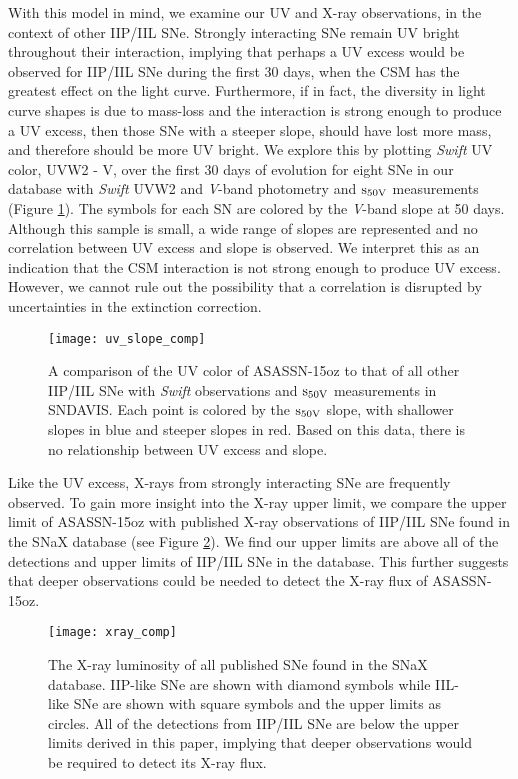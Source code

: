 \documentclass[a4paper,fleqn,usenatbib]{mnras}
\begin{document}
With this model in mind, we examine our UV and X-ray observations, in the context of other IIP/IIL SNe.
Strongly interacting SNe remain UV bright throughout their interaction, implying that perhaps a UV excess would be observed for IIP/IIL SNe during the first 30 days, when the CSM has the greatest effect on the light curve.
Furthermore, if in fact, the diversity in light curve shapes is due to mass-loss and the interaction is strong enough to produce a UV excess, then those SNe with a steeper slope, should have lost more mass, and therefore should be more UV bright.
We explore this by plotting {\it Swift} UV color, UVW2 - V, over the first 30 days of evolution for eight SNe in our database with {\it Swift} UVW2 and {\it V}-band photometry and $\rm{s_{50V}}$ measurements (Figure \ref{fig:UVColor}). 
The symbols for each SN are colored by the {\it V}-band slope at 50 days. 
Although this sample is small, a wide range of slopes are represented and no correlation between UV excess and slope is observed.
We interpret this as an indication that the CSM interaction is not strong enough to produce UV excess.
However, we cannot rule out the possibility that a correlation is disrupted by uncertainties in the extinction correction.
\begin{figure}
\begin{center}
\texttt{[image: uv\_slope\_comp]} %
\caption{A comparison of the UV color of ASASSN-15oz to that of all other IIP/IIL SNe with \textit{Swift} observations and $\rm{s_{50V}}$ measurements in SNDAVIS.
Each point is colored by the $\rm{s_{50V}}$ slope, with shallower slopes in blue and steeper slopes in red. 
Based on this data, there is no relationship between UV excess and slope.}
\label{fig:UVColor}
\end{center}
\end{figure}

Like the UV excess, X-rays from strongly interacting SNe are frequently observed.
To gain more insight into the X-ray upper limit, we compare the upper limit of ASASSN-15oz with published X-ray observations of IIP/IIL SNe found in the SNaX database \citep{2017ross} (see Figure \ref{fig:xray}).
We find our upper limits are above all of the detections and upper limits of IIP/IIL SNe in the database.
This further suggests that deeper observations could be needed to detect the X-ray flux of ASASSN-15oz.
\begin{figure}
\begin{center}
\texttt{[image: xray\_comp]} %
\caption{The X-ray luminosity of all published SNe found in the SNaX database. 
IIP-like SNe are shown with diamond symbols while IIL-like SNe are shown with square symbols and the upper limits as circles.
All of the detections from IIP/IIL SNe are below the upper limits derived in this paper, implying that deeper observations would be required to detect its X-ray flux.}
\label{fig:xray}
\end{center}
\end{figure}
\end{document}
